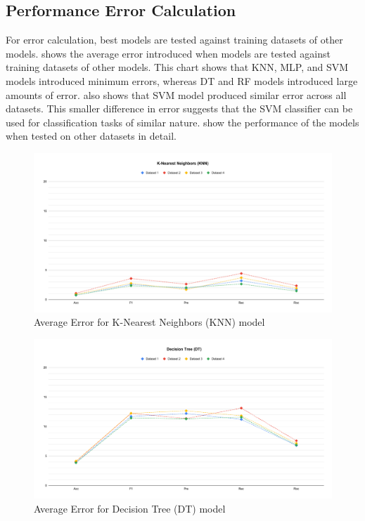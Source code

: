 \subsection{Performance Error Calculation}
For error calculation, best models are tested against training datasets of other models.  shows the average error introduced when models are tested against training datasets of other models. This chart shows that KNN, MLP, and SVM models introduced minimum errors, whereas DT and RF models introduced large amounts of error.  also shows that SVM model produced similar error across all datasets. This smaller difference in error suggests that the SVM classifier can be used for classification tasks of similar nature.  show the performance of the models when tested on other datasets in detail.

\begin{figure}[ht]
    \centering
    \includegraphics[width=1.9\columnwidth]{media/ch_result_and_testing/delta_KNN.pdf}
    \caption{Average Error for K-Nearest Neighbors (KNN) model} \label{fig:perfromance_delta_knn}
\end{figure}

\begin{figure}[ht]
    \centering
    \includegraphics[width=1.9\columnwidth]{media/ch_result_and_testing/delta_DT.pdf}
    \caption{Average Error for Decision Tree (DT) model} \label{fig:perfromance_delta_dt}
\end{figure}

